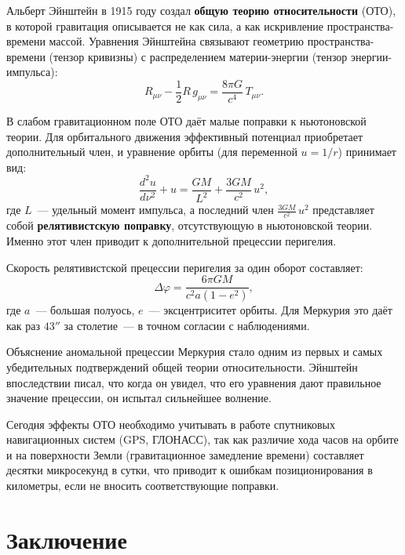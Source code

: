\documentclass[12pt,a4paper]{article}
\begin{document}
Альберт Эйнштейн в 1915 году создал \textbf{общую теорию относительности}
(ОТО), в которой гравитация описывается не как сила, а как искривление
пространства-времени массой. Уравнения Эйнштейна связывают геометрию
пространства-времени (тензор кривизны) с распределением
материи-энергии (тензор энергии-импульса):
\begin{equation}
  R_{\mu\nu} - \frac{1}{2}R\,g_{\mu\nu} = \frac{8\pi G}{c^4}\,T_{\mu\nu}.
\end{equation}

В слабом гравитационном поле ОТО даёт малые поправки к ньютоновской теории.
Для орбитального движения эффективный потенциал приобретает дополнительный
член, и уравнение орбиты (для переменной $u = 1/r$) принимает вид:
\begin{equation}
  \frac{d^2 u}{d\nu^2} + u = \frac{GM}{L^2} + \frac{3GM}{c^2}\,u^2,
\end{equation}
где $L$~--- удельный момент импульса, а последний член $\frac{3GM}{c^2}\,u^2$
представляет собой \textbf{релятивистскую поправку}, отсутствующую в
ньютоновской теории. Именно этот член приводит к дополнительной прецессии
перигелия.

Скорость релятивистской прецессии перигелия за один оборот составляет:
\begin{equation}
  \Delta\varphi = \frac{6\pi G M}{c^2 a (1 - e^2)},
\end{equation}
где $a$~--- большая полуось, $e$~--- эксцентриситет орбиты. Для Меркурия
это даёт как раз $43''$ за столетие~--- в точном согласии с наблюдениями.

Объяснение аномальной прецессии Меркурия стало одним из первых и самых
убедительных подтверждений общей теории относительности. Эйнштейн
впоследствии писал, что когда он увидел, что его уравнения дают правильное
значение прецессии, он испытал сильнейшее волнение.

Сегодня эффекты ОТО необходимо учитывать в работе спутниковых навигационных
систем (GPS, ГЛОНАСС), так как различие хода часов на орбите и на
поверхности Земли (гравитационное замедление времени) составляет десятки
микросекунд в сутки, что приводит к ошибкам позиционирования в километры,
если не вносить соответствующие поправки.

\section{Заключение}
\end{document}
